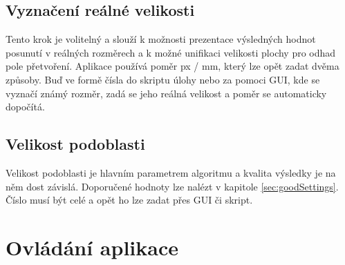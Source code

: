 \documentclass[a4paper,12pt]{article}
\begin{document}
\subsection{Vyznačení reálné velikosti}
Tento krok je volitelný a slouží k možnosti prezentace výsledných hodnot posunutí v reálných rozměrech a k možné unifikaci velikosti plochy pro odhad pole přetvoření. Aplikace používá poměr px / mm, který lze opět zadat dvěma způsoby. Buď ve formě čísla do skriptu úlohy nebo za pomoci GUI, kde se vyznačí známý rozměr, zadá se jeho reálná velikost a poměr se automaticky dopočítá.
\subsection{Velikost podoblasti}
Velikost podoblasti je hlavním parametrem algoritmu a kvalita výsledky je na něm dost závislá. Doporučené hodnoty lze nalézt v kapitole \ref{sec:goodSettings}. Číslo musí být celé a opět ho lze zadat přes GUI či skript.
\newpage
\section{Ovládání aplikace}
\label{sec:gui}
\end{document}

